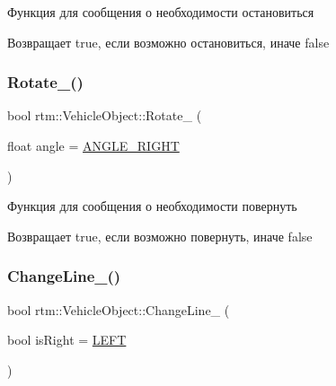 Функция для сообщения о необходимости остановиться 

\begin{DoxyReturn}{Возвращает}
true, если возможно остановиться, иначе false 
\end{DoxyReturn}
\mbox{\label{classrtm_1_1_vehicle_object_a0739284311dc651679c0c5954f240758}} 
\subsubsection{\texorpdfstring{Rotate\+\_\+()}{Rotate\_()}}
{\footnotesize\ttfamily bool rtm\+::\+Vehicle\+Object\+::\+Rotate\+\_\+ (\begin{DoxyParamCaption}\item[{float}]{angle = {\ttfamily \hyperlink{namespacertm_a39212dd73aa5a6387211cf776bdb64d8}{A\+N\+G\+L\+E\+\_\+\+R\+I\+G\+HT}} }\end{DoxyParamCaption})\hspace{0.3cm}{\ttfamily [protected]}}



Функция для сообщения о необходимости повернуть 

\begin{DoxyReturn}{Возвращает}
true, если возможно повернуть, иначе false 
\end{DoxyReturn}
\mbox{\label{classrtm_1_1_vehicle_object_a73ef7c4f1318bdbe2cd75dc4f07aca4e}} 
\subsubsection{\texorpdfstring{Change\+Line\+\_\+()}{ChangeLine\_()}}
{\footnotesize\ttfamily bool rtm\+::\+Vehicle\+Object\+::\+Change\+Line\+\_\+ (\begin{DoxyParamCaption}\item[{bool}]{is\+Right = {\ttfamily \hyperlink{namespacertm_a92d29773a54951290dd89f754fb39a8c}{L\+E\+FT}} }\end{DoxyParamCaption})\hspace{0.3cm}{\ttfamily [protected]}}




